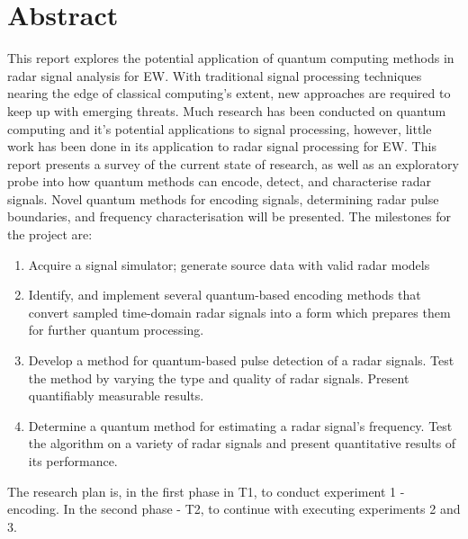 \section*{Abstract}

This report explores the potential application of quantum computing methods in radar signal analysis for \ac{EW}.
With traditional signal processing techniques nearing the edge of classical computing's extent, new approaches are required to keep up with emerging threats.
Much research has been conducted on quantum computing and it's potential applications to signal processing, however, little work has been done in its application to radar signal processing for \ac{EW}.
This report presents a survey of the current state of research, as well as an exploratory probe into how quantum methods can encode, detect, and characterise radar signals.
Novel quantum methods for encoding signals, determining radar pulse boundaries, and frequency characterisation will be presented.
The milestones for the project are:
\begin{enumerate}
    \item Acquire a signal simulator; generate source data with valid radar models
    \item Identify, and implement several quantum-based encoding methods that convert sampled time-domain radar signals into a form which prepares them for further quantum processing.
    \item Develop a method for quantum-based pulse detection of a radar signals. Test the method by varying the type and quality of radar signals. Present quantifiably measurable results.
    \item Determine a quantum method for estimating a radar signal’s frequency. Test the algorithm on a variety of radar signals and present quantitative results of its performance.
\end{enumerate}

The research plan is, in the first phase in T1, to conduct experiment 1 - encoding. In the second phase - T2, to continue with executing experiments 2 and 3.